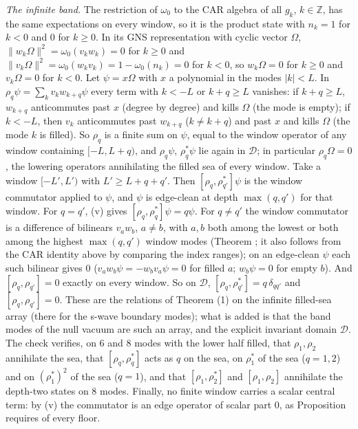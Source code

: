 \emph{The infinite band.} The restriction of $\omega_{0}$ to the CAR algebra of all $g_{k}$, $k \in \mathbb{Z}$, has the same expectations on every window, so it is the product state with $n_{k} = 1$ for $k < 0$ and $0$ for $k \ge 0$. In its GNS representation with cyclic vector $\Omega$, $\|w_{k}\Omega\|^{2} = \omega_{0}(v_{k}w_{k}) = 0$ for $k \ge 0$ and $\|v_{k}\Omega\|^{2} = \omega_{0}(w_{k}v_{k}) = 1 - \omega_{0}(n_{k}) = 0$ for $k < 0$, so $w_{k}\Omega = 0$ for $k \ge 0$ and $v_{k}\Omega = 0$ for $k < 0$. Let $\psi = x\Omega$ with $x$ a polynomial in the modes $|k| < L$. In $\rho_{q}\psi = \sum_{k}v_{k}w_{k+q}\psi$ every term with $k < -L$ or $k + q \ge L$ vanishes: if $k + q \ge L$, $w_{k+q}$ anticommutes past $x$ (degree by degree) and kills $\Omega$ (the mode is empty); if $k < -L$, then $v_{k}$ anticommutes past $w_{k+q}$ ($k \ne k + q$) and past $x$ and kills $\Omega$ (the mode $k$ is filled). So $\rho_{q}$ is a finite sum on $\psi$, equal to the window operator of any window containing $[-L, L + q)$, and $\rho_{q}\psi$, $\rho_{q}^{*}\psi$ lie again in $\mathcal{D}$; in particular $\rho_{q}\Omega = 0$, the lowering operators annihilating the filled sea of every window. Take a window $[-L', L')$ with $L' \ge L + q + q'$. Then $[\rho_{q}, \rho_{q'}^{*}]\psi$ is the window commutator applied to $\psi$, and $\psi$ is edge-clean at depth $\max(q, q')$ for that window. For $q = q'$, (v) gives $[\rho_{q}, \rho_{q}^{*}]\psi = q\psi$. For $q \ne q'$ the window commutator is a difference of bilinears $v_{a}w_{b}$, $a \ne b$, with $a, b$ both among the lowest or both among the highest $\max(q, q')$ window modes (Theorem ; it also follows from the CAR identity above by comparing the index ranges); on an edge-clean $\psi$ each such bilinear gives $0$ ($v_{a}w_{b}\psi = -w_{b}v_{a}\psi = 0$ for filled $a$; $w_{b}\psi = 0$ for empty $b$). And $[\rho_{q}, \rho_{q'}] = 0$ exactly on every window. So on $\mathcal{D}$, $[\rho_{q}, \rho_{q'}^{*}] = q\,\delta_{qq'}$ and $[\rho_{q}, \rho_{q'}] = 0$. These are the relations of Theorem (1) on the infinite filled-sea array (there for the s-wave boundary modes); what is added is that the band modes of the null vacuum are such an array, and the explicit invariant domain $\mathcal{D}$. The check verifies, on $6$ and $8$ modes with the lower half filled, that $\rho_{1}, \rho_{2}$ annihilate the sea, that $[\rho_{q}, \rho_{q}^{*}]$ acts as $q$ on the sea, on $\rho_{1}^{*}$ of the sea ($q = 1, 2$) and on $(\rho_{1}^{*})^{2}$ of the sea ($q = 1$), and that $[\rho_{1}, \rho_{2}^{*}]$ and $[\rho_{1}, \rho_{2}]$ annihilate the depth-two states on $8$ modes. Finally, no finite window carries a scalar central term: by (v) the commutator is an edge operator of scalar part $0$, as Proposition  requires of every floor.

